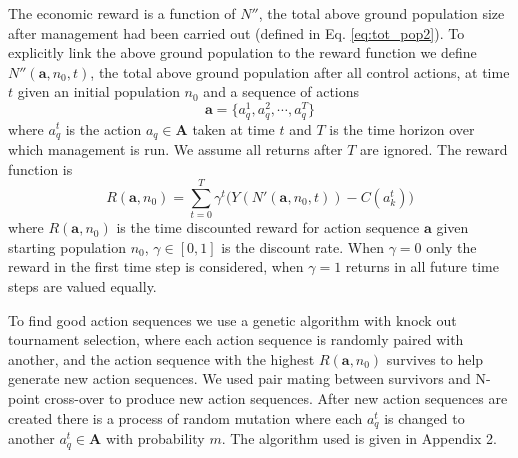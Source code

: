 \documentclass[12pt, a4paper]{article}
\begin{document}
The economic reward is a function of $N''$, the total above ground population size after management had been carried out (defined in Eq. \ref{eq:tot_pop2}). To explicitly link the above ground population to the reward function we define $N''(\mathbf{a}, n_0, t)$, the total above ground population after all control actions, at time $t$ given an initial population $n_0$ and a sequence of actions 
\begin{equation}
	\mathbf{a} = \{a_q^1, a_q^2, \cdots, a_q^T\}
\end{equation}	   
where $a_q^t$ is the action $a_q \in \mathbf{A}$ taken at time $t$ and $T$ is the time horizon over which management is run. We assume all returns after $T$ are ignored. The reward function is  
\begin{equation}
	R(\mathbf{a}, n_0) = \sum_{t=0}^T \gamma^t \Big( Y(N'(\mathbf{a}, n_0, t)) - C(a_k^t) \Big)
\end{equation}
where $R(\mathbf{a}, n_0)$ is the time discounted reward for action sequence $\mathbf{a}$ given starting population $n_0$, $\gamma \in [0, 1]$ is the discount rate. When $\gamma = 0$ only the reward in the first time step is considered, when $\gamma = 1$ returns in all future time steps are valued equally.

To find good action sequences we use a genetic algorithm with knock out tournament selection, where each action sequence is randomly paired with another, and the action sequence with the highest $R(\mathbf{a}, n_0)$ survives to help generate new action sequences. We used pair mating between survivors and N-point cross-over to produce new action sequences. After new action sequences are created there is a process of random mutation where each $a_q^t$ is changed to another $a_q^t \in \mathbf{A}$ with probability $m$. The algorithm used is given in Appendix 2.        
\end{document}
